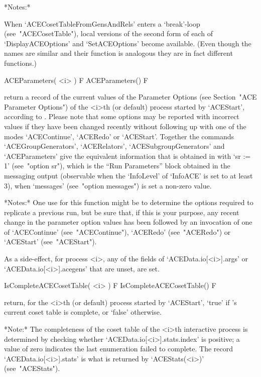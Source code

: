 *Notes:*

When    `ACECosetTableFromGensAndRels'    enters    a     `break'-loop
(see~"ACECosetTable"), local versions of the second form  of  each  of
`DisplayACEOptions' and `SetACEOptions' become available. (Even though
the names are similar and their function is analogous they are in fact
different functions.)

\>ACEParameters( <i> ) F
\>ACEParameters() F

return a record of the current values of the {\ACE} Parameter  Options
(see Section~"ACE  Parameter  Options")  of  the  <i>th  (or  default)
process started by `ACEStart', according to {\ACE}. Please  note  that
some options may be reported with incorrect values if they  have  been
changed  recently  without  following  up  with  one  of   the   modes
`ACEContinue',  `ACERedo'  or  `ACEStart'.   Together   the   commands
`ACEGroupGenerators',   `ACERelators',   `ACESubgroupGenerators'   and
`ACEParameters'  give  the  equivalent  {\GAP}  information  that   is
obtained in {\ACE} with `sr := 1'  (see~"option  sr"),  which  is  the
``Run Parameters'' block obtained in the messaging output  (observable
when the `InfoLevel'  of  `InfoACE'  is  set  to  at  least  3),  when
`messages' (see~"option messages") is set a non-zero value.

*Notes:*
One use for this function might be to determine the  options  required
to replicate a previous run,  but  be  sure  that,  if  this  is  your
purpose, any recent change in the parameter  option  values  has  been
followed by an invocation of one of `ACEContinue' (see~"ACEContinue"),
`ACERedo' (see~"ACERedo") or `ACEStart' (see~"ACEStart").

As a side-effect, for  {\ACE}  process  <i>,  any  of  the  fields  of
`ACEData.io[<i>].args' or `ACEData.io[<i>].acegens'  that  are  unset,
are set.

\>IsCompleteACECosetTable( <i> ) F
\>IsCompleteACECosetTable() F

return, for the <i>th (or  default)  process  started  by  `ACEStart',
`true' if  {\ACE}'s  current  coset  table  is  complete,  or  `false'
otherwise.

*Note:*
The completeness of the coset table of the  <i>th  interactive  {\ACE}
process      is       determined       by       checking       whether
`ACEData.io[<i>].stats.index' is positive; a value of  zero  indicates
the   last   enumeration    failed    to    complete.    The    record
`ACEData.io[<i>].stats'  is  what  is  returned   by   `ACEStats(<i>)'
(see~"ACEStats").

